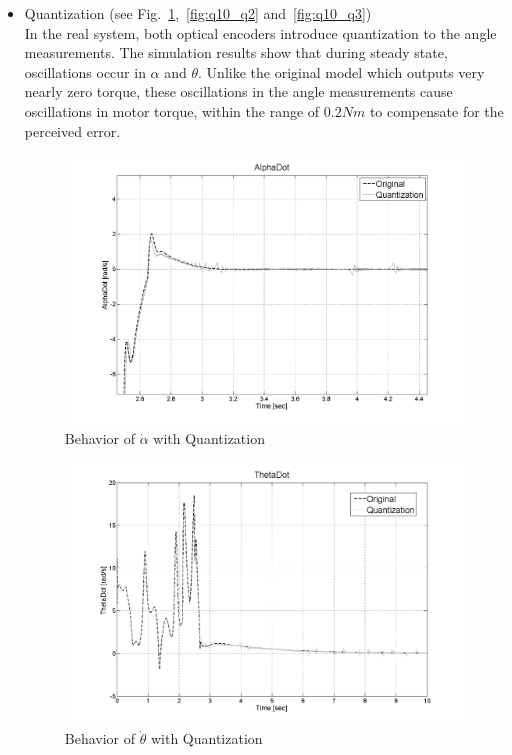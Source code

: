 \documentclass{article}
\theoremstyle{plain}
\theoremstyle{definition}
\theoremstyle{remark}
\begin{document}
\begin{itemize}
\item Quantization (see Fig.~\ref{fig:q10_q1},~\ref{fig:q10_q2} and~\ref{fig:q10_q3})\\
In the real system, both optical encoders introduce quantization to the angle measurements. The simulation results show that during steady state, oscillations occur in $\alpha$ and $\theta$.  Unlike the original model which outputs very nearly zero torque, these oscillations in the angle measurements cause oscillations in motor torque, within the range of $0.2 Nm$ to compensate for the perceived error.   
\begin{figure}[h]
\includegraphics[width=1\textwidth]{q10_q1.png}
\caption{Behavior of $\dot{\alpha}$ with Quantization} \label{tex}
\label{fig:q10_q1}
\end{figure}
\begin{figure}[h]
\includegraphics[width=1\textwidth]{q10_q2.png}
\caption{Behavior of $\dot{\theta}$ with Quantization} \label{tex}

\end{figure}
\end{itemize}
\end{document}
